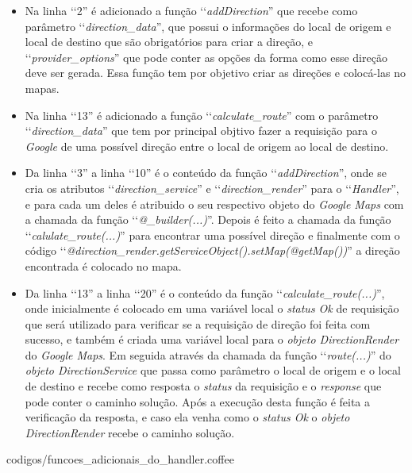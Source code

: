 \begin{itemize}

 \item Na linha ‘‘2'' é adicionado a função ‘‘\emph{addDirection}'' que recebe como parâmetro 
 ‘‘\emph{direction\_data}'', que possui o informações do local de origem e local de destino que são 
 obrigatórios para criar a direção, e ‘‘\emph{provider\_options}'' que pode conter as opções da forma
 como esse direção deve ser gerada. Essa função tem por objetivo criar as direções e colocá-las no mapas.
 
 \item Na linha ‘‘13'' é adicionado a função ‘‘\emph{calculate\_route}'' com o parâmetro 
 ‘‘\emph{direction\_data}'' que tem por principal objtivo fazer a requisição para o \emph{Google } de uma 
 possível direção entre o local de origem ao local de destino.
 
 \item Da linha ‘‘3'' a linha ‘‘10'' é o conteúdo da função ‘‘\emph{addDirection}'', onde se cria os
 atributos ‘‘\emph{direction\_service}'' e ‘‘\emph{direction\_render}'' para o ‘‘\emph{Handler}'', e
 para cada um deles é atribuido o seu respectivo objeto do \emph{Google Maps} com a chamada da função 
 ‘‘\emph{@\_builder(...)}''. Depois é feito a chamada da função ‘‘\emph{calulate\_route(...)}''
 para encontrar uma possível direção e finalmente com o código 
 ‘‘\emph{@direction\_render.getServiceObject().setMap(@getMap())}'' a direção encontrada é colocado 
 no mapa.
 
 \item Da linha ‘‘13'' a linha ‘‘20'' é o conteúdo da função ‘‘\emph{calculate\_route(...)}'', onde 
 inicialmente é colocado em uma variável local o \emph{status Ok} de requisição que será utilizado
 para verificar se a requisição de direção foi feita com sucesso, e também é criada uma variável local 
 para o \emph{objeto DirectionRender} do \emph{Google Maps}. Em seguida através da chamada da função 
 ‘‘\emph{route(...)}'' do \emph{objeto DirectionService} que passa como parâmetro o local de origem e
 o local de destino e recebe como resposta o \emph{status} da requisição e o \emph{response} que pode
 conter o caminho solução. Após a execução desta função é feita a verificação da resposta, e caso 
 ela venha como o \emph{status Ok} o \emph{objeto DirectionRender} recebe o caminho solução.
 
\end{itemize}


{codigos/funcoes_adicionais_do_handler.coffee}

